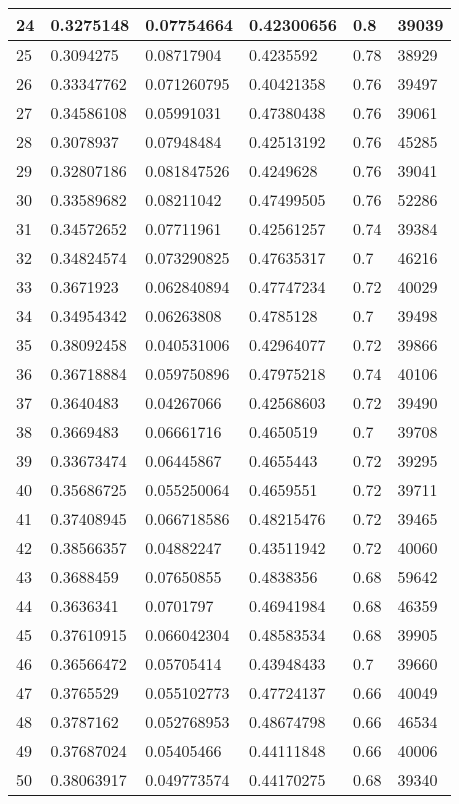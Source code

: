 \begin{longtable}{|l|l|l|l|l|l|}
24 & 0.3275148 & 0.07754664 & 0.42300656 & 0.8 & 39039 \\ \hline 
25 & 0.3094275 & 0.08717904 & 0.4235592 & 0.78 & 38929 \\ \hline 
26 & 0.33347762 & 0.071260795 & 0.40421358 & 0.76 & 39497 \\ \hline 
27 & 0.34586108 & 0.05991031 & 0.47380438 & 0.76 & 39061 \\ \hline 
28 & 0.3078937 & 0.07948484 & 0.42513192 & 0.76 & 45285 \\ \hline 
29 & 0.32807186 & 0.081847526 & 0.4249628 & 0.76 & 39041 \\ \hline 
30 & 0.33589682 & 0.08211042 & 0.47499505 & 0.76 & 52286 \\ \hline 
31 & 0.34572652 & 0.07711961 & 0.42561257 & 0.74 & 39384 \\ \hline 
32 & 0.34824574 & 0.073290825 & 0.47635317 & 0.7 & 46216 \\ \hline 
33 & 0.3671923 & 0.062840894 & 0.47747234 & 0.72 & 40029 \\ \hline 
34 & 0.34954342 & 0.06263808 & 0.4785128 & 0.7 & 39498 \\ \hline 
35 & 0.38092458 & 0.040531006 & 0.42964077 & 0.72 & 39866 \\ \hline 
36 & 0.36718884 & 0.059750896 & 0.47975218 & 0.74 & 40106 \\ \hline 
37 & 0.3640483 & 0.04267066 & 0.42568603 & 0.72 & 39490 \\ \hline 
38 & 0.3669483 & 0.06661716 & 0.4650519 & 0.7 & 39708 \\ \hline 
39 & 0.33673474 & 0.06445867 & 0.4655443 & 0.72 & 39295 \\ \hline 
40 & 0.35686725 & 0.055250064 & 0.4659551 & 0.72 & 39711 \\ \hline 
41 & 0.37408945 & 0.066718586 & 0.48215476 & 0.72 & 39465 \\ \hline 
42 & 0.38566357 & 0.04882247 & 0.43511942 & 0.72 & 40060 \\ \hline 
43 & 0.3688459 & 0.07650855 & 0.4838356 & 0.68 & 59642 \\ \hline 
44 & 0.3636341 & 0.0701797 & 0.46941984 & 0.68 & 46359 \\ \hline 
45 & 0.37610915 & 0.066042304 & 0.48583534 & 0.68 & 39905 \\ \hline 
46 & 0.36566472 & 0.05705414 & 0.43948433 & 0.7 & 39660 \\ \hline 
47 & 0.3765529 & 0.055102773 & 0.47724137 & 0.66 & 40049 \\ \hline 
48 & 0.3787162 & 0.052768953 & 0.48674798 & 0.66 & 46534 \\ \hline 
49 & 0.37687024 & 0.05405466 & 0.44111848 & 0.66 & 40006 \\ \hline 
50 & 0.38063917 & 0.049773574 & 0.44170275 & 0.68 & 39340 \\ \hline 
\end{longtable}
